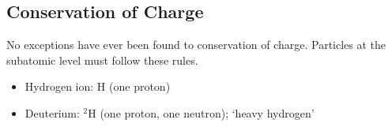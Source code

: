 \documentclass[../PhysicsFormulae.tex]{subfiles}
\begin{document}
\subsection{Conservation of Charge}
No exceptions have ever been found to conservation of charge. Particles at the subatomic level must follow these rules. 
\begin{itemize}
	\item Hydrogen ion: $\mathrm{H}$ (one proton)
	\item Deuterium: $\mathrm{^2 H}$ (one proton, one neutron); `heavy hydrogen'
\end{itemize}
\end{document}
